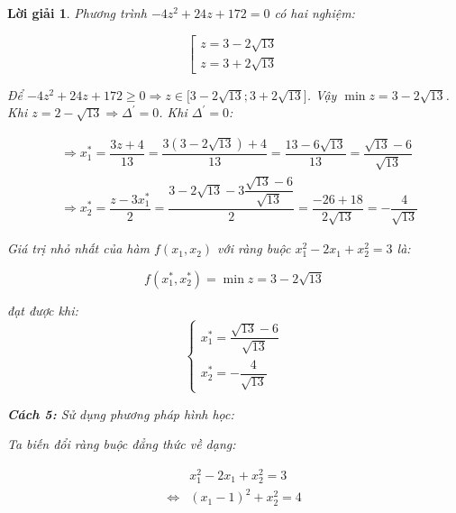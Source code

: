 \documentclass[14pt, a4paper]{article}
\theoremstyle{sltheorem}
\theoremstyle{soltheorem}
\newtheorem*{loigiai}{Lời giải}
\begin{document}
\begin{loigiai}
        Phương trình $-4 z^2 + 24z + 172 = 0$ có hai nghiệm:

        \begin{equation*}
            \left [\begin{array}{l} z = 3 - 2 \sqrt{13} \\ z = 3 + 2 \sqrt{13} \end{array} \right.
        \end{equation*}

        Để $-4 z^2 + 24z + 172 \geq 0 \Rightarrow z \in \lbrack 3 - 2\sqrt{13}; 3 + 2 \sqrt{13} \rbrack$.
        Vậy $\min z = 3 - 2 \sqrt{13}$. Khi $z = 2 - \sqrt{13} \Rightarrow \Delta^{\prime} = 0$.
        Khi $\Delta^{\prime}=0$:

        \begin{equation*}
            \begin{aligned}
                &\Rightarrow x_1^* = \dfrac{3z + 4}{13}=\dfrac{3 (3 - 2\sqrt{13}) + 4}{13}=\dfrac{13 - 6\sqrt{13}}{13}=\dfrac{\sqrt{13} - 6}{\sqrt{13}} \\
                &\Rightarrow x_2^* = \dfrac{z - 3x_1^*}{2}=\dfrac{3 - 2\sqrt{13} - 3 \dfrac{\sqrt{13} - 6}{\sqrt{13}}}{2}=\dfrac{-26 + 18}{2\sqrt{13}}=-\dfrac{4}{\sqrt{13}}
            \end{aligned}
        \end{equation*}

        Giá trị nhỏ nhất của hàm $f(x_1, x_2)$ với ràng buộc $x_1^2 - 2x_1 + x_2^2 = 3$ là:

        \begin{equation*}
            f(x_1^*, x_2^*) = \min z = 3 - 2\sqrt{13}
        \end{equation*}

        đạt được khi:
        \begin{equation*}
            \begin{cases} 
                x_1^* = \dfrac{\sqrt{13} - 6}{\sqrt{13}} \\ 
                x_2^* = - \dfrac{4}{\sqrt{13}} 
            \end{cases}
        \end{equation*}

        \textbf{Cách 5:} Sử dụng phương pháp hình học:

        Ta biến đổi ràng buộc đẳng thức về dạng:

        \begin{equation*}
            \begin{aligned}
            &x_1^2 - 2x_1 + x_2^2 = 3 \\
            \Leftrightarrow & (x_1 - 1)^2 + x_2^2 = 4
            \end{aligned}
        \end{equation*}


\end{loigiai}
\end{document}

